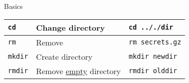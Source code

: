 \documentclass{beamer}
\let\tt\texttt
\let\ul\underline
\begin{document}
  \begin{frame}{Basics}
          \begin{tabular}{l l l}
                  \hline
                  \tt{cd}           &
                  Change directory  &
                  \tt{cd .././dir}  \\
                  \hline
                  \tt{rm}           &
                  Remove &
                  \tt{rm secrets.gz}  \\
                  \hline
                  \tt{mkdir}           &
                  Create directory &
                  \tt{mkdir newdir}  \\
                  \hline
                  \tt{rmdir}           &
                  Remove \ul{empty} directory &
                  \tt{rmdir olddir}  \\
                  \hline
          \end{tabular}
  \end{frame}
\end{document}
